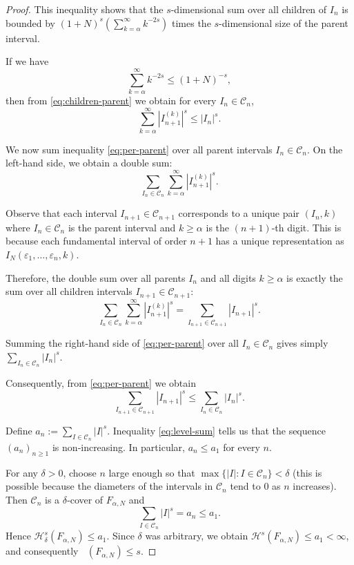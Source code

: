 \documentclass[10pt,a4paper]{amsart}
\newcommand{\Ha}{\mathcal{H}}
\DeclareMathOperator{\dimH}{dim_H}
\begin{document}
\begin{proof}
This inequality shows that the $s$-dimensional sum over all children of $I_n$ is bounded by 
$(1+N)^s \left( \sum_{k=\alpha}^{\infty} k^{-2s} \right)$ times the $s$-dimensional size of the parent interval.

If we have
\begin{equation}\label{eq:key-condition}
\sum_{k=\alpha}^{\infty} k^{-2s} \leq (1+N)^{-s},
\end{equation}
then from \eqref{eq:children-parent} we obtain for every $I_n \in \mathcal{C}_n$,
\begin{equation}\label{eq:per-parent}
\sum_{k=\alpha}^{\infty} |I_{n+1}^{(k)}|^s \leq |I_n|^s .
\end{equation}

We now sum inequality \eqref{eq:per-parent} over all parent intervals $I_n \in \mathcal{C}_n$. 
On the left-hand side, we obtain a double sum:
\[
\sum_{I_n \in \mathcal{C}_n} \sum_{k=\alpha}^{\infty} |I_{n+1}^{(k)}|^s .
\]

Observe that each interval $I_{n+1} \in \mathcal{C}_{n+1}$ corresponds to a unique pair 
$(I_n, k)$ where $I_n \in \mathcal{C}_n$ is the parent interval and $k \geq \alpha$ is the 
$(n+1)$-th digit. This is because each fundamental interval of order $n+1$ has a unique 
representation as $I_N(\varepsilon_1, \dots, \varepsilon_n, k)$. 

Therefore, the double sum over all parents $I_n$ and all digits $k \geq \alpha$ is exactly 
the sum over all children intervals $I_{n+1} \in \mathcal{C}_{n+1}$:
\[
\sum_{I_n \in \mathcal{C}_n} \sum_{k=\alpha}^{\infty} |I_{n+1}^{(k)}|^s 
= \sum_{I_{n+1} \in \mathcal{C}_{n+1}} |I_{n+1}|^s .
\]

Summing the right-hand side of \eqref{eq:per-parent} over all $I_n \in \mathcal{C}_n$ gives 
simply $\sum_{I_n \in \mathcal{C}_n} |I_n|^s$.

Consequently, from \eqref{eq:per-parent} we obtain
\begin{equation}\label{eq:level-sum}
\sum_{I_{n+1} \in \mathcal{C}_{n+1}} |I_{n+1}|^s \leq \sum_{I_n \in \mathcal{C}_n} |I_n|^s .
\end{equation}

Define $a_n := \sum_{I \in \mathcal{C}_n} |I|^s$. Inequality \eqref{eq:level-sum} tells us that 
the sequence $(a_n)_{n\geq 1}$ is non‑increasing. In particular, $a_n \leq a_1$ for every $n$.

For any $\delta > 0$, choose $n$ large enough so that $\max\{|I| : I \in \mathcal{C}_n\} < \delta$
(this is possible because the diameters of the intervals in $\mathcal{C}_n$ tend to $0$ as $n$ increases). 
Then $\mathcal{C}_n$ is a $\delta$‑cover of $F_{\alpha,N}$ and
\[
\sum_{I \in \mathcal{C}_n} |I|^s = a_n \leq a_1 .
\]
Hence $\Ha^s_\delta(F_{\alpha,N}) \leq a_1$. Since $\delta$ was arbitrary, we obtain 
$\Ha^s(F_{\alpha,N}) \leq a_1 < \infty$, and consequently $\dimH(F_{\alpha,N}) \leq s$.


\end{proof}
\end{document}
